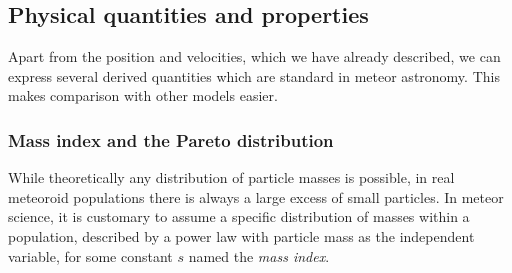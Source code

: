 %
%
%
%
%

    \subsection{Physical quantities and properties} \label{mop}
        Apart from the position and velocities, which we have already described, we can express
        several derived quantities which are standard in meteor astronomy. This makes comparison
        with other models easier.

        \subsubsection{Mass index and the Pareto distribution} \label{moms}
            While theoretically any distribution of particle masses is possible,
            in real meteoroid populations there is always a large excess of small particles.
            In meteor science, it is customary to assume a specific distribution of masses within a population,
            described by a power law with particle mass as the independent variable,
            for some constant $s$ named the \emph{mass index}.

